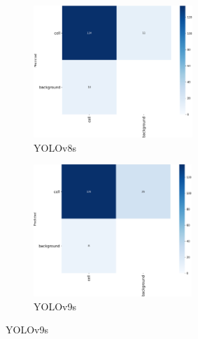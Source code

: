 \documentclass[12pt,a4paper,onecolumn,oneside]{report}
\begin{document}
\begin{figure}[H]
  \centering
  \vspace{-0.3cm}
  \begin{subfigure}[b]{0.45\textwidth}
    \centering
    \includegraphics[height=5cm]{figuras/resultados experimentacion/yolov8s/test2/confusion_matrix.png}
    \vspace{-0.3cm}
    \caption{\footnotesize YOLOv8s}
    \label{fig:confusion_yolov8s_test2}
  \end{subfigure}
  \hfill
  \begin{subfigure}[b]{0.45\textwidth}
    \centering
    \includegraphics[height=5cm]{figuras/resultados experimentacion/yolov9s/test2/confusion_matrix.png}
    \vspace{-0.3cm}
    \caption{\footnotesize YOLOv9s}
    \label{fig:confusion_yolov9s_test2}
  \end{subfigure}
  

\end{figure}
\end{document}
